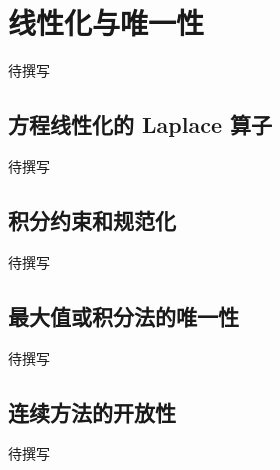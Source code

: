
% 
% 

\section{线性化与唯一性}
\label{g4:sec:3102}

待撰写

\subsection{方程线性化的 Laplace 算子}
\label{g4:subsec:3102:01}
待撰写

\subsection{积分约束和规范化}
\label{g4:subsec:3102:02}
待撰写

\subsection{最大值或积分法的唯一性}
\label{g4:subsec:3102:03}
待撰写

\subsection{连续方法的开放性}
\label{g4:subsec:3102:04}
待撰写
